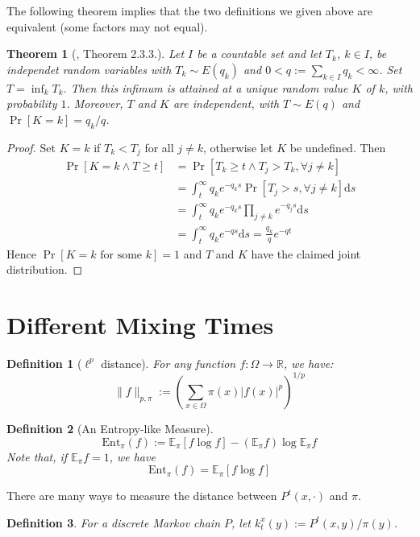 \documentclass{article}
\newtheorem{define}{Definition}[section]
\newtheorem{theorem}{Theorem}[section]
\begin{document}
The following theorem implies that the two definitions we given above are equivalent (some factors may not equal).
\begin{theorem}[\cite{norris1998markov}, Theorem 2.3.3.]
  Let $I$ be a countable set and let $T_k$, $k\in I$, be independet random variables with $T_k \sim E(q_k)$ and $0 < q := \sum_{k\in I} q_k < \infty$. Set $T = \inf_k T_k$. Then this infimum is attained at a unique random value $K$ of $k$, with probability $1$. Moreover, $T$ and $K$ are independent, with $T\sim E(q)$ and $\Pr[K = k] = q_k / q$.
\end{theorem}
\begin{proof}
  Set $K = k$ if $T_k < T_j$ for all $j\not= k$, otherwise let $K$ be undefined.
  Then
  \begin{align*}
    \Pr[K = k \land T \geq t]
    &= \Pr[T_k \geq t \land T_j > T_k, \forall j\not= k] \\
    &= \int_t^\infty q_ke^{-q_k s}\Pr[T_j > s, \forall j\not= k]\mathrm{d}s \\
    &= \int_t^\infty q_ke^{-q_k s}\prod_{j\not=k} e^{-q_j s} \mathrm{d} s\\
    &= \int_t^\infty q_k e^{-q s} \mathrm{d} s = \frac{q_k}{q}e^{-q t} 
  \end{align*}
  Hence $\Pr[K = k \mbox{ for some $k$}] = 1$ and $T$ and $K$ have the claimed joint distribution.
\end{proof}

\section{Different Mixing Times}
\begin{define}[$\ell^p$ distance]
  For any function $f:\Omega \to \mathbb{R}$, we have:
  \[\parallel f \parallel_{p, \pi} := \left(\sum_{x\in\Omega}\pi(x) |f(x)|^p\right)^{1/p}\]
\end{define}

\begin{define}[An Entropy-like Measure]
  \[\mathrm{Ent}_\pi(f) := \mathbb{E}_\pi[f \log f] - (\mathbb{E}_\pi f) \log \mathbb{E}_\pi f\]
  Note that, if $\mathbb{E}_\pi f = 1$, we have
  \[\mathrm{Ent}_\pi(f) = \mathbb{E}_\pi[f \log f]\]
\end{define}

There are many ways to measure the distance between $P^t(x, \cdot)$ and $\pi$.

\begin{define}
  For a discrete Markov chain $P$, let $k^x_t(y) := P^t(x,y)/\pi(y)$.
\end{define}
\end{document}
